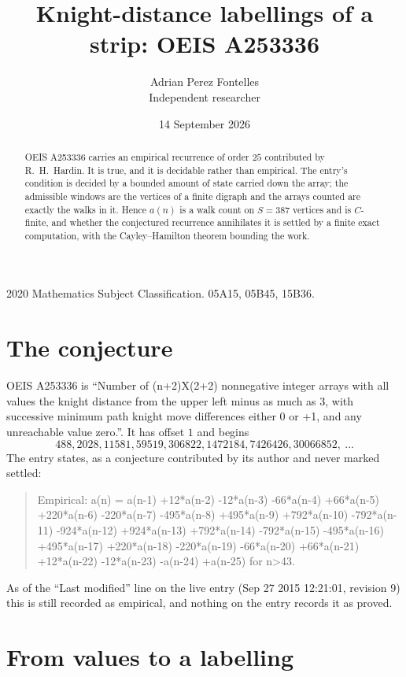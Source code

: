 \documentclass[11pt,a4paper]{article}
\title{Knight-distance labellings of a strip: OEIS A253336}
\author{Adrian Perez Fontelles\\ \small Independent researcher}
\date{14 September 2026}
\theoremstyle{plain}
\theoremstyle{definition}
\begin{document}
\maketitle

\begin{abstract}
OEIS A253336 carries an empirical recurrence of order $25$ contributed by R.~H.~Hardin. It is
true, and it is decidable rather than empirical. The entry's condition is decided by a bounded amount of state carried down the array; the
admissible windows are the vertices of a finite digraph and the arrays counted are exactly the
walks in it. Hence $a(n)$ is a walk count on $S=387$ vertices and is $C$-finite, and whether the
conjectured recurrence annihilates it is settled by a finite exact computation, with the
Cayley--Hamilton theorem bounding the work.
\end{abstract}

\noindent\small 2020 Mathematics Subject Classification. 05A15, 05B45, 15B36.\normalsize

\section{The conjecture}

OEIS A253336 is ``Number of (n+2)X(2+2) nonnegative integer arrays with all values the knight distance from the upper left minus as much as 3, with successive minimum path knight move differences either 0 or +1, and any unreachable value zero.''. It has offset $1$ and begins
\[
488, 2028, 11581, 59519, 306822, 1472184, 7426426, 30066852,\ \dots
\]
The entry states, as a conjecture contributed by its author and never marked settled:
\begin{quote}
Empirical: a(n) = a(n-1) +12*a(n-2) -12*a(n-3) -66*a(n-4) +66*a(n-5) +220*a(n-6) -220*a(n-7) -495*a(n-8) +495*a(n-9) +792*a(n-10) -792*a(n-11) -924*a(n-12) +924*a(n-13) +792*a(n-14) -792*a(n-15) -495*a(n-16) +495*a(n-17) +220*a(n-18) -220*a(n-19) -66*a(n-20) +66*a(n-21) +12*a(n-22) -12*a(n-23) -a(n-24) +a(n-25) for n>43.
\end{quote}
As of the ``Last modified'' line on the live entry (Sep 27 2015 12:21:01, revision 9) this is still
recorded as empirical, and nothing on the entry records it as proved.

\section{From values to a labelling}
\end{document}
